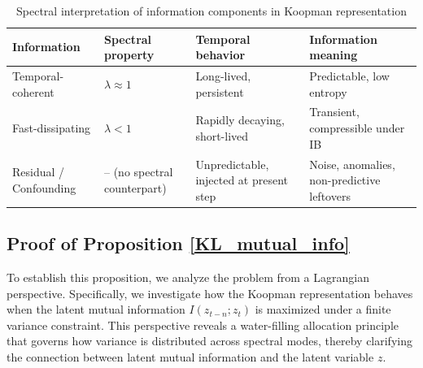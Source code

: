 \documentclass{article} %
\begin{document}
\begin{table}[h]
\centering
\caption{Spectral interpretation of information components in Koopman representation}
\label{tab:summary_of_claim_3}
\begin{tabularx}{0.95\textwidth}{@{} lXXX @{}}
\toprule
\textbf{Information} & \textbf{Spectral property} & \textbf{Temporal behavior} & \textbf{Information meaning} \\
\midrule
Temporal-coherent & $ \lambda \approx 1$ & Long-lived, persistent & Predictable, low entropy \\
Fast-dissipating & $ \lambda < 1$ & Rapidly decaying, short-lived & Transient, compressible under IB \\
Residual / Confounding & --  (no spectral counterpart) & Unpredictable, injected at present step & Noise, anomalies, non-predictive leftovers \\
\bottomrule
\end{tabularx}
\label{tab:info_components}
\end{table}





\subsection{Proof of Proposition \ref{KL_mutual_info}}
\label{claim:mutual_info_gaussian}

To establish this proposition, we analyze the problem from a Lagrangian perspective. Specifically, we investigate how the Koopman representation behaves when the latent mutual information $I(z_{t-n};z_t)$ is maximized under a finite variance constraint. This perspective reveals a water-filling allocation principle that governs how variance is distributed across spectral modes, thereby clarifying the connection between latent mutual information and the latent variable $z$. 
\end{document}
